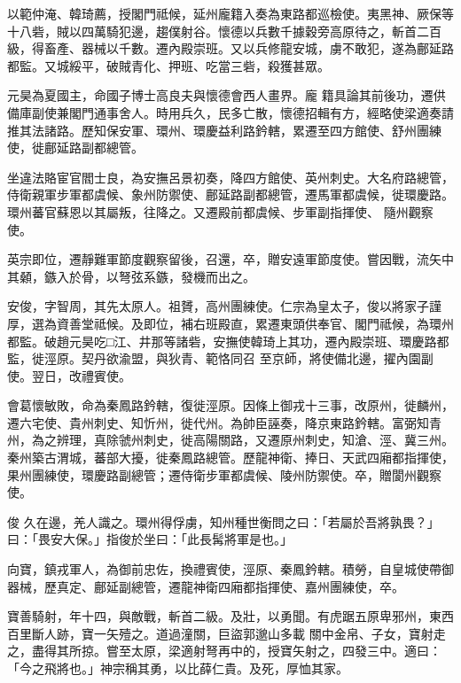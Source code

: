 \begin{pinyinscope}
 以範仲淹、韓琦薦，授閣門祗候，延州龐籍入奏為東路都巡檢使。夷黑神、厥保等十八砦，賊以四萬騎犯邊，趨僕射谷。懷德以兵數千據穀旁高原待之，斬首二百級，得畜產、器械以千數。遷內殿崇班。又以兵修龍安城，虜不敢犯，遂為鄜延路都監。又城綏平，破賊青化、押班、吃當三砦，殺獲甚眾。



 元昊為夏國主，命國子博士高良夫與懷德會西人畫界。龐
 籍具論其前後功，遷供備庫副使兼閣門通事舍人。時用兵久，民多亡散，懷德招輯有方，經略使梁適奏請推其法諸路。歷知保安軍、環州、環慶益利路鈐轄，累遷至四方館使、舒州團練使，徙鄜延路副都總管。



 坐違法賂宦官閻士良，為安撫呂景初奏，降四方館使、英州刺史。大名府路總管，侍衛親軍步軍都虞候、象州防禦使、鄜延路副都總管，遷馬軍都虞候，徙環慶路。環州蕃官蘇恩以其屬叛，往降之。又遷殿前都虞候、步軍副指揮使、
 隨州觀察使。



 英宗即位，遷靜難軍節度觀察留後，召還，卒，贈安遠軍節度使。嘗因戰，流矢中其顙，鏃入於骨，以弩弦系鏃，發機而出之。



 安俊，字智周，其先太原人。祖贇，高州團練使。仁宗為皇太子，俊以將家子謹厚，選為資善堂祗候。及即位，補右班殿直，累遷東頭供奉官、閣門祗候，為環州都監。破趙元昊吃□江、井那等諸砦，安撫使韓琦上其功，遷內殿崇班、環慶路都監，徙涇原。契丹欲渝盟，與狄青、範恪同召
 至京師，將使備北邊，擢內園副使。翌日，改禮賓使。



 會葛懷敏敗，命為秦鳳路鈐轄，復徙涇原。因條上御戎十三事，改原州，徙麟州，遷六宅使、貴州刺史、知忻州，徙代州。為帥臣誣奏，降京東路鈐轄。富弼知青州，為之辨理，真除虢州刺史，徙高陽關路，又遷原州刺史，知滄、涇、冀三州。秦州築古渭城，蕃部大擾，徙秦鳳路總管。歷龍神衛、捧日、天武四廂都指揮使，果州團練使，環慶路副總管；遷侍衛步軍都虞候、陵州防禦使。卒，贈閬州觀察使。



 俊
 久在邊，羌人識之。環州得俘虜，知州種世衡問之曰：「若屬於吾將孰畏？」曰：「畏安大保。」指俊於坐曰：「此長髯將軍是也。」



 向寶，鎮戎軍人，為御前忠佐，換禮賓使，涇原、秦鳳鈐轄。積勞，自皇城使帶御器械，歷真定、鄜延副總管，遷龍神衛四廂都指揮使、嘉州團練使，卒。



 寶善騎射，年十四，與敵戰，斬首二級。及壯，以勇聞。有虎踞五原卑邪州，東西百里斷人跡，寶一矢殪之。道過潼關，巨盜郭邈山多載
 關中金帛、子女，寶射走之，盡得其所掠。嘗至太原，梁適射弩再中的，授寶矢射之，四發三中。適曰：「今之飛將也。」神宗稱其勇，以比薛仁貴。及死，厚恤其家。




\end{pinyinscope}
